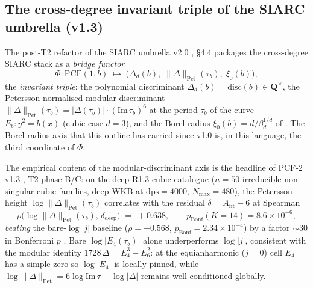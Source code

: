 \documentclass[11pt,reqno]{amsart}
\theoremstyle{plain}
\theoremstyle{definition}
\theoremstyle{remark}
\newcommand{\PCF}{\mathrm{PCF}}
\begin{document}
\subsection{The cross-degree invariant triple of the SIARC
umbrella (v1.3)}
\label{ssec:invariant-triple}

The post-T2 refactor of the SIARC umbrella v2.0
\cite{siarc_umbrella_v2}, \S4.4 packages the cross-degree
SIARC stack as a \emph{bridge functor}
\[
  \Phi : \PCF(1,b) \;\longmapsto\;
  \bigl(\Delta_d(b),\;\|\Delta\|_{\mathrm{Pet}}(\tau_b),\;
        \xi_0(b)\bigr),
\]
the \emph{invariant triple}: the polynomial discriminant
$\Delta_d(b) = \mathrm{disc}(b) \in \mathbf{Q}^\times$, the
Petersson-normalised modular discriminant
$\|\Delta\|_{\mathrm{Pet}}(\tau_b) =
|\Delta(\tau_b)| \cdot (\mathrm{Im}\,\tau_b)^6$ at the
period $\tau_b$ of the curve $E_b: y^2 = b(x)$ (cubic case
$d=3$), and the Borel radius $\xi_0(b) = d/\beta_d^{1/d}$
of . The Borel-radius axis that this
outline has carried since v1.0 is, in this language, the
third coordinate of $\Phi$.

The empirical content of the modular-discriminant axis is
the headline of PCF-2 v1.3 \cite{siarc_pcf2_v13}, T2 phase
B/C: on the deep R1.3 cubic catalogue ($n=50$ irreducible
non-singular cubic families, deep WKB at
$\mathrm{dps} = 4000$, $N_{\max} = 480$), the Petersson
height $\log\|\Delta\|_{\mathrm{Pet}}(\tau_b)$ correlates
with the residual $\delta = A_{\mathrm{fit}} - 6$ at
Spearman
\[
  \rho\bigl(\log\|\Delta\|_{\mathrm{Pet}}(\tau_b),\,\delta_{\mathrm{deep}}\bigr)
   \;=\; +0.638,
  \qquad p_{\mathrm{Bonf}}(K{=}14) = 8.6\times 10^{-6},
\]
\emph{beating} the bare-$\log|j|$ baseline
($\rho = -0.568$, $p_{\mathrm{Bonf}} = 2.34\times 10^{-4}$)
by a factor ${\sim}30$ in Bonferroni $p$
\cite{siarc_pcf2_session_t2}. Bare $\log|E_4(\tau_b)|$
alone underperforms $\log|j|$, consistent with the
modular identity $1728\,\Delta = E_4^3 - E_6^2$: at the
equianharmonic ($j = 0$) cell $E_4$ has a simple zero so
$\log|E_4|$ is locally pinned, while
$\log\|\Delta\|_{\mathrm{Pet}}
= 6\log\mathrm{Im}\,\tau + \log|\Delta|$ remains
well-conditioned globally.
\end{document}

